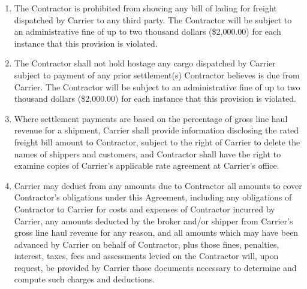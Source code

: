 \begin{enumerate}
    \item The Contractor is prohibited from showing any bill of lading for
    freight dispatched by Carrier to any third party. The Contractor will
    be subject to an administrative fine of up to two thousand dollars
    (\$2,000.00) for each instance that this provision is violated.

    \item The Contractor shall not hold hostage any cargo dispatched by
    Carrier subject to payment of any prior settlement(s) Contractor
    believes is due from Carrier. The Contractor will be subject to an
    administrative fine of up to two thousand dollars (\$2,000.00) for each
    instance that this provision is violated.

    \item Where settlement payments are based on the percentage of gross
    line haul revenue for a shipment, Carrier shall provide information
    disclosing the rated freight bill amount to Contractor, subject to the
    right of Carrier to delete the names of shippers and customers, and
    Contractor shall have the right to examine copies of Carrier's
    applicable rate agreement at Carrier's office.

    \item Carrier may deduct from any amounts due to Contractor all amounts
    to cover Contractor's obligations under this Agreement, including any
    obligations of Contractor to Carrier for costs and expenses of
    Contractor incurred by Carrier, any amounts deducted by the broker
    and/or shipper from Carrier's gross line haul revenue for any reason,
    and all amounts which may have been advanced by Carrier on behalf of
    Contractor, plus those fines, penalties, interest, taxes, fees and
    assessments levied on the Contractor will, upon request, be provided by
    Carrier those documents necessary to determine and compute such charges
    and deductions.
\end{enumerate}